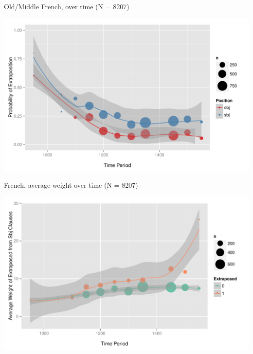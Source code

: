 \documentclass[hyperref={pdfpagelabels=false}]{beamer}
\begin{document}
\begin{frame}{Old/Middle French, over time (N = 8207)}

\begin{center}
\includegraphics[width=1.1\textwidth]{exSbjObjYearBinned50Loessfre.pdf}
\end{center}
\end{frame}


\begin{frame}{French, average weight over time (N = 8207)}

\begin{center}
\includegraphics[width=1.1\textwidth]{exWeightYearBinned50Loessfre.pdf}
\end{center}
\end{frame}
\end{document}
